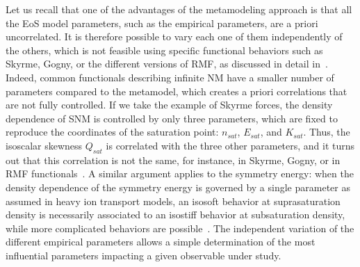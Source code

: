 Let us recall that one of the advantages of the metamodeling approach is that 
all the EoS model parameters, such as the empirical parameters, are a priori
uncorrelated. 
It is therefore possible to vary each one of them independently of the others, 
which is not feasible using specific functional behaviors such as Skyrme, 
Gogny, or the different versions of RMF, as discussed in detail
in~\cite{Margueron2018a,Margueron2019}. 
Indeed, common functionals describing infinite NM have a smaller number of 
parameters compared to the metamodel, which creates a priori correlations that 
are not fully controlled. If we take the example of Skyrme forces, the density 
dependence of SNM is controlled by only three parameters, which are fixed 
to reproduce the coordinates of the saturation point: $n_{sat}$, $E_{sat}$, and 
$K_{sat}$. Thus, the isoscalar skewness $Q_{sat}$ is correlated with the 
three other parameters, and it turns out that this correlation is not the same, 
for instance, in Skyrme, Gogny, or in RMF functionals~\cite{Margueron2019}. A 
similar argument applies to the symmetry energy: when the density dependence of 
the symmetry energy is governed by a single parameter as assumed in heavy ion 
transport models, an isosoft behavior at suprasaturation density is necessarily 
associated to an isostiff behavior at subsaturation density, while more 
complicated behaviors are possible~\cite{Margueron2019}. The independent 
variation of the different empirical parameters allows a simple determination 
of the most influential parameters impacting a given observable under study. 

